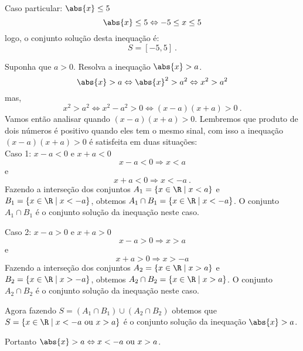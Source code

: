 \begin{exem}
   Caso particular: $\abs{x} \leq 5$
\begin{equation}
\abs{x} \leq 5 \Leftrightarrow -5 \leq x \leq 5
\end{equation}
   logo, o conjunto solução desta inequação é:
\begin{equation}
S= [-5, 5] \ . 
\end{equation}
\end{exem}

\begin{exem}
   Suponha que $a> 0$. Resolva a inequação $\abs{x} > a$.
\begin{equation}
\abs{x} > a \Leftrightarrow \abs{x}^2 > a^2 \Leftrightarrow x^2 > a^2
\end{equation}
   mas,
\begin{equation}
x^2 > a^2 \Leftrightarrow x^2 - a^2 > 0 \Leftrightarrow (x-a)(x+a) > 0 \ .
\end{equation}
   Vamos então analisar quando $(x-a)(x+a) > 0$. Lembremos que produto de dois números é positivo quando eles tem o mesmo sinal, com isso a inequação $(x-a)(x+a) > 0$ é satisfeita em duas situações:\\
   Caso 1: $x-a< 0$ e $x+a< 0$
\begin{equation}
x-a< 0 \Rightarrow x< a
\end{equation}
   e
\begin{equation}
x+a< 0 \Rightarrow x< -a \ .
\end{equation}
  Fazendo a interseção dos conjuntos $A_1= \left\{ x \in \R \mid x<a \right\}$ e $B_1= \left\{ x \in \R \mid x< -a \right\}$, obtemos $A_1 \cap B_1= \left\{ x \in \R \mid x< -a \right\}$. O conjunto $A_1 \cap B_1$ é o conjunto solução da inequação neste caso.


   Caso 2: $x-a> 0$ e $x+a> 0$
\begin{equation}
x-a> 0 \Rightarrow x> a
\end{equation}
   e
\begin{equation}
x+a> 0 \Rightarrow x> -a 
\end{equation}
   Fazendo a interseção dos conjuntos $A_2= \left\{ x \in \R \mid x> a \right\}$ e $B_2= \left\{ x \in \R \mid x> -a \right\}$, obtemos $A_2 \cap B_2= \left\{ x \in \R \mid x> a \right\}$. O conjunto $A_2 \cap B_2$ é o conjunto solução da inequação neste caso.

   Agora fazendo $S= (A_1 \cap B_1) \cup (A_2 \cap B_2)$ obtemos que $S= \left\{ x \in \R \mid x<-a \text{ ou } x> a \right\}$ é o conjunto solução da inequação $\abs{x} > a$.

  Portanto $\abs{x} > a \Leftrightarrow x<-a \text{ ou } x> a$.
\end{exem}

